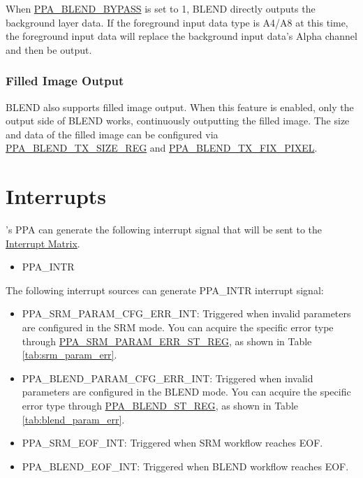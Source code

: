 \documentclass[main\_\_EN.tex]{subfiles}
\begin{document}
When \hyperref[fielddesc:PPABLENDBYPASS]{PPA\_BLEND\_BYPASS} is set to 1, BLEND directly outputs the background layer data. If the foreground input data type is A4/A8 at this time, the foreground input data will replace the background input data's Alpha channel and then be output.

\subsubsection{Filled Image Output}
BLEND also supports filled image output. When this feature is enabled, only the output side of BLEND works, continuously outputting the filled image. The size and data of the filled image can be configured via \hyperref[regdesc:PPABLENDTXSIZEREG]{PPA\_BLEND\_TX\_SIZE\_REG} and \hyperref[fielddesc:PPABLENDTXFIXPIXEL]{PPA\_BLEND\_TX\_FIX\_PIXEL}.


\section{Interrupts}


\chipname{}'s PPA can generate the following interrupt signal that will be sent to the \hyperref[mod:intmtrx]{Interrupt Matrix}.

    \begin{itemize}
        \item PPA\_INTR
    \end{itemize}

The following interrupt sources can generate PPA\_INTR interrupt signal:

\begin{itemize}
    \item \label{int:PPASRMPARAMCFGERR}PPA\_SRM\_PARAM\_CFG\_ERR\_INT: Triggered when invalid parameters are configured in the SRM mode. You can acquire the specific error type through \hyperref[regdesc:PPASRMPARAMERRSTREG]{PPA\_SRM\_PARAM\_ERR\_ST\_REG}, as shown in Table \ref{tab:srm_param_err}.
    \item \label{int:PPABLENDPARAMCFGERR}PPA\_BLEND\_PARAM\_CFG\_ERR\_INT: Triggered when invalid parameters are configured in the BLEND mode. You can acquire the specific error type through \hyperref[regdesc:PPABLENDSTREG]{PPA\_BLEND\_ST\_REG}, as shown in Table \ref{tab:blend_param_err}.
    \item \label{int:PPASRMEOF}PPA\_SRM\_EOF\_INT: Triggered when SRM workflow reaches EOF.
    \item \label{int:PPABLENDEOF}PPA\_BLEND\_EOF\_INT: Triggered when BLEND workflow reaches EOF.
\end{itemize}
\end{document}
